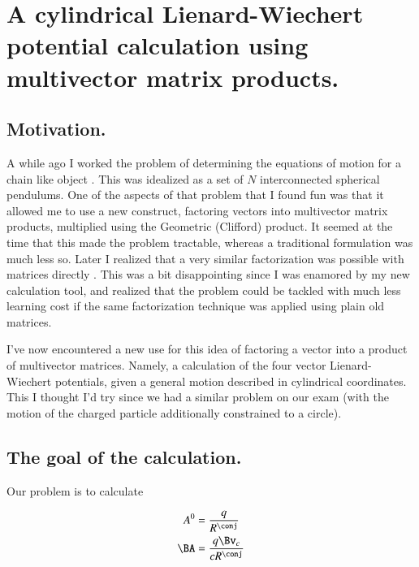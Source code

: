 %
%

\chapter{A cylindrical Lienard-Wiechert potential calculation using multivector matrix products.}
\label{chap:matrixVectorPotentials}
{}
\date{April 30, 2011}

\beginArtWithToc

\section{Motivation.}

A while ago I worked the problem of determining the equations of motion for a chain like object .  This was idealized as a set of $N$ interconnected spherical pendulums.  One of the aspects of that problem that I found fun was that it allowed me to use a new construct, factoring vectors into multivector matrix products, multiplied using the Geometric (Clifford) product.  It seemed at the time that this made the problem tractable, whereas a traditional formulation was much less so.  Later I realized that a very similar factorization was possible with matrices directly \citep{multiPendulumSphericalMatrix}.  This was a bit disappointing since I was enamored by my new calculation tool, and realized that the problem could be tackled with much less learning cost if the same factorization technique was applied using plain old matrices.

I've now encountered a new use for this idea of factoring a vector into a product of multivector matrices.  Namely, a calculation of the four vector Lienard-Wiechert potentials, given a general motion described in cylindrical coordinates.  This I thought I'd try since we had a similar problem on our exam (with the motion of the charged particle additionally constrained to a circle).

\section{The goal of the calculation.}

Our problem is to calculate

\begin{align}\label{eqn:matrixVectorPotentials:10}
A^0 &= \frac{q}{R^\conj} \\
\BA &= \frac{q \Bv_c}{c R^\conj}
\end{align}

